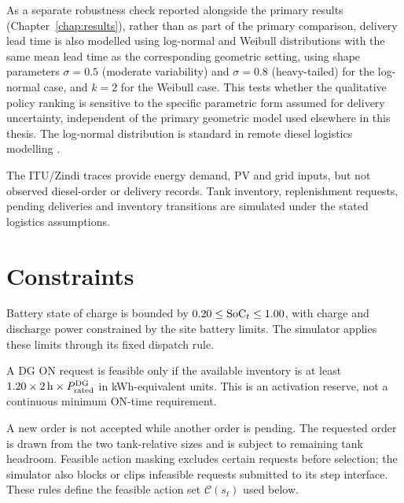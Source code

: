 As a separate robustness check reported alongside the primary results
(Chapter~\ref{chap:results}), rather than as part of the primary
comparison, delivery lead time is also modelled using log-normal and
Weibull distributions with the same mean lead time as the corresponding
geometric setting, using shape parameters $\sigma=0.5$ (moderate
variability) and $\sigma=0.8$ (heavy-tailed) for the log-normal case, and
$k=2$ for the Weibull case. This tests whether the qualitative policy
ranking is sensitive to the specific parametric form assumed for delivery
uncertainty, independent of the primary geometric model used elsewhere in
this thesis. The log-normal distribution is standard in remote diesel
logistics modelling \citep{srinivasan2013,shen2011}.

\begin{revisedblock}
The ITU/Zindi traces provide energy demand, PV and grid inputs, but
not observed diesel-order or delivery records. Tank inventory,
replenishment requests, pending deliveries and inventory transitions
are simulated under the stated logistics assumptions.
\end{revisedblock}

\section{Constraints}
\label{sec:constraints}

\begin{revisedblock}
Battery state of charge is bounded by
$0.20\leq\mathrm{SoC}_t\leq1.00$, with charge and discharge
power constrained by the site battery limits. The simulator
applies these limits through its fixed dispatch rule.

A DG ON request is feasible only if the available inventory is
at least $1.20\times2\,\mathrm{h}\times
P_{\mathrm{rated}}^{\mathrm{DG}}$ in kWh-equivalent units. This
is an activation reserve, not a continuous minimum ON-time
requirement.

A new order is not accepted while another order is pending.
The requested order is drawn from the two tank-relative sizes
and is subject to remaining tank headroom. Feasible action
masking excludes certain requests before selection; the
simulator also blocks or clips infeasible requests submitted
to its step interface. These rules define the feasible action
set $\mathcal C(s_t)$ used below.
\end{revisedblock}

